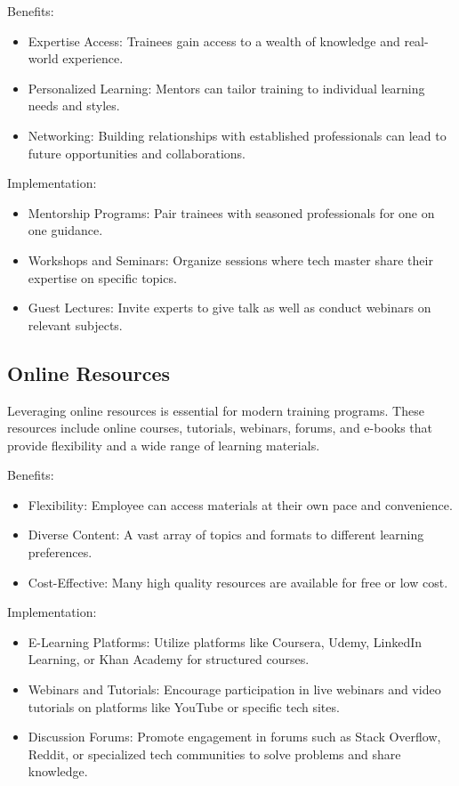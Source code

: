 Benefits:
\begin{itemize}
    

  \item  Expertise Access: Trainees gain access to a wealth of knowledge and real-world experience.
  \item Personalized Learning: Mentors can tailor training to individual learning needs and styles.
  \item Networking: Building relationships with established professionals can lead to future opportunities and collaborations.
\end{itemize}
\newpage
Implementation:
\begin{itemize}
  \item   Mentorship Programs: Pair trainees with seasoned professionals for one on one guidance.
    \item Workshops and Seminars: Organize sessions where tech master share their expertise on specific topics.
    \item Guest Lectures: Invite experts to give talk as well as conduct webinars on relevant subjects.
\end{itemize}
\subsection{Online Resources}


Leveraging online resources is essential for modern training programs. These resources include online courses, tutorials, webinars, forums, and e-books that provide flexibility and a wide range of learning materials.

Benefits:
\begin{itemize}
   \item Flexibility: Employee can access materials at their own pace and convenience.
    \item Diverse Content: A vast array of topics and formats to different learning preferences.
    \item Cost-Effective: Many high quality resources are available for free or low cost.
\end{itemize}
Implementation:
\begin{itemize}
    \item E-Learning Platforms: Utilize platforms like Coursera, Udemy, LinkedIn Learning, or Khan Academy for structured courses.
    \item Webinars and Tutorials: Encourage participation in live webinars and video tutorials on platforms like YouTube or specific tech sites.
    \item Discussion Forums: Promote engagement in forums such as Stack Overflow, Reddit, or specialized tech communities to solve problems and share knowledge.
\end{itemize}
